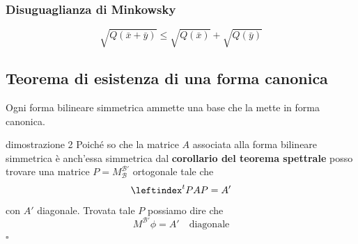\documentclass[x11names]{article}
\newcommand*{\QEDB}{\null\nobreak\hfill\ensuremath{\square}}%
\begin{document}
\begin{center}
	\colorbox{myred}{\begin{minipage}{5.75in}
			\begin{redes}{}
				\subsubsection{Disuguaglianza di Minkowsky}
				\[
				\sqrt{Q(\bar{x}+\bar{y})} \leq \sqrt{Q(\bar{x})} + \sqrt{Q(\bar{y})}
				\]
			\end{redes}
	\end{minipage}}        
\end{center}
 
 \begin{center}
 	\colorbox{myred}{\begin{minipage}{5.75in}
 			\begin{redes}{}
 				\subsection{Teorema di esistenza di una forma canonica}
 				Ogni forma bilineare simmetrica ammette una base che la mette in forma canonica.
 			\end{redes}
 	\end{minipage}}        
 \end{center}
\begin{es}{dimostrazione 2}
	Poiché so che la matrice $A$ associata alla forma bilineare simmetrica è anch'essa simmetrica dal \textbf{corollario del teorema spettrale} posso trovare una matrice $P = M^{\mathcal{B'}}_{\mathcal{B}}$ ortogonale tale che 
	\[
	\leftindex^{t}{P}AP = A' 
	\]
	con $A'$ diagonale. Trovata tale $P$ possiamo dire che 
	\[
	M^{\mathcal{B'}}\phi = A' \quad \text{diagonale}
	\] \QEDB
\end{es}
\end{document}
